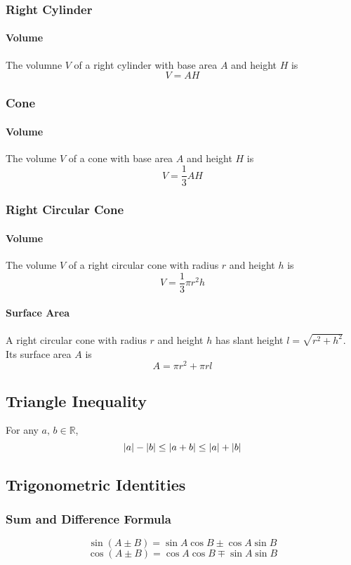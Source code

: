 \documentclass[../ma2002_notes.tex]{subfiles}
\begin{document}
\subsubsection{Right Cylinder}
\paragraph{Volume}
The volumne \(V\) of a right cylinder with base area \(A\) and height \(H\) is
\[V=AH\]

\subsubsection{Cone}
\paragraph{Volume}
The volume \(V\) of a cone with base area \(A\) and height \(H\) is
\[V=\frac{1}{3}AH\]

\subsubsection{Right Circular Cone}
\paragraph{Volume}
The volume \(V\) of a right circular cone with radius \(r\) and height \(h\) is
\[V=\frac{1}{3}\pi r^2h\]

\paragraph{Surface Area}
A right circular cone with radius \(r\) and height \(h\) has slant height \(l=\sqrt{r^2+h^2}\). Its surface area \(A\) is
\[A=\pi r^2+\pi rl\]

\subsection{Triangle Inequality}
For any \(a,\,b\in\mathbb{R}\),
\[\lvert a\rvert-\lvert b\rvert\leq\lvert a+b\rvert\leq\lvert a\rvert+\lvert b\rvert\]

\subsection{Trigonometric Identities}
\subsubsection{Sum and Difference Formula}
\[\sin(A\pm B) = \sin A \cos B \pm \cos A \sin B\]
\[\cos(A\pm B) = \cos A \cos B \mp \sin A \sin B \]
\end{document}

